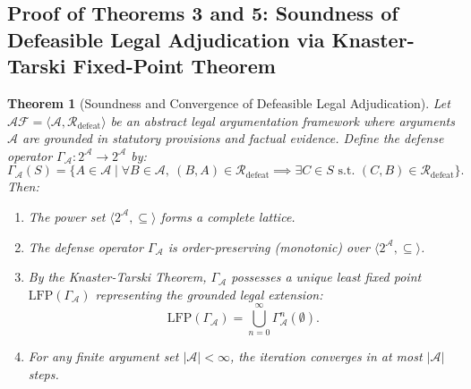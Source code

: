 \documentclass[11pt,a4paper]{article}
\newtheorem*{theorem*}{Theorem}
\begin{document}
\subsection{Proof of Theorems 3 and 5: Soundness of Defeasible Legal Adjudication via Knaster-Tarski Fixed-Point Theorem}
\label{proof:thm3_5}

\begin{theorem*}[Soundness and Convergence of Defeasible Legal Adjudication]
Let $\mathcal{AF} = \langle \mathcal{A}, \mathcal{R}_{\mathrm{defeat}} \rangle$ be an abstract legal argumentation framework where arguments $\mathcal{A}$ are grounded in statutory provisions and factual evidence. Define the defense operator $\Gamma_{\mathcal{A}}: 2^{\mathcal{A}} \to 2^{\mathcal{A}}$ by:
\begin{equation}
\Gamma_{\mathcal{A}}(S) = \{ A \in \mathcal{A} \mid \forall B \in \mathcal{A}, \ (B, A) \in \mathcal{R}_{\mathrm{defeat}} \implies \exists C \in S \text{ s.t. } (C, B) \in \mathcal{R}_{\mathrm{defeat}} \}.
\end{equation}
Then:
\begin{enumerate}[label=(\roman*)]
    \item The power set $\langle 2^{\mathcal{A}}, \subseteq \rangle$ forms a complete lattice.
    \item The defense operator $\Gamma_{\mathcal{A}}$ is order-preserving (monotonic) over $\langle 2^{\mathcal{A}}, \subseteq \rangle$.
    \item By the Knaster-Tarski Theorem, $\Gamma_{\mathcal{A}}$ possesses a unique least fixed point $\mathrm{LFP}(\Gamma_{\mathcal{A}})$ representing the grounded legal extension:
    \begin{equation}
    \mathrm{LFP}(\Gamma_{\mathcal{A}}) = \bigcup_{n=0}^{\infty} \Gamma_{\mathcal{A}}^n(\emptyset).
    \end{equation}
    \item For any finite argument set $|\mathcal{A}| < \infty$, the iteration converges in at most $|\mathcal{A}|$ steps.
\end{enumerate}
\end{theorem*}
\end{document}
